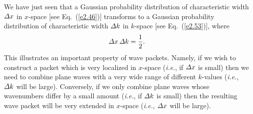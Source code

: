 We have just seen that a Gaussian probability distribution of characteristic
width ${\mit\Delta} x$ in $x$-space [see Eq.~(\ref{e2.46})] transforms to a Gaussian probability distribution of characteristic width
${\mit\Delta} k$ in $k$-space [see Eq.~(\ref{e2.53})],
where
\begin{equation}
{\mit\Delta}x\,{\mit\Delta} k = \frac{1}{2}.
\end{equation}
This illustrates an important property of wave packets. Namely, if we wish to
construct a packet which is very localized in $x$-space ({\em i.e.}, if ${\mit\Delta}x$ is small) then we need
to combine plane waves with a very wide range of different $k$-values
({\em i.e.}, ${\mit\Delta}k$ will be large). Conversely, if we only combine
plane waves whose wavenumbers differ by a small amount ({\em i.e.}, if
${\mit\Delta}k$ is small) then the resulting wave packet will be very
extended in $x$-space ({\em i.e.}, ${\mit\Delta}x$ will be large).

